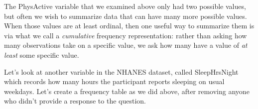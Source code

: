 \documentclass[]{book}
\newenvironment{Shaded}{\begin{snugshade}}{\end{snugshade}}
\newcommand{\KeywordTok}[1]{\textcolor[rgb]{0.13,0.29,0.53}{\textbf{#1}}}
\newcommand{\DataTypeTok}[1]{\textcolor[rgb]{0.13,0.29,0.53}{#1}}
\newcommand{\DecValTok}[1]{\textcolor[rgb]{0.00,0.00,0.81}{#1}}
\newcommand{\StringTok}[1]{\textcolor[rgb]{0.31,0.60,0.02}{#1}}
\newcommand{\CommentTok}[1]{\textcolor[rgb]{0.56,0.35,0.01}{\textit{#1}}}
\newcommand{\OperatorTok}[1]{\textcolor[rgb]{0.81,0.36,0.00}{\textbf{#1}}}
\newcommand{\NormalTok}[1]{#1}
\theoremstyle{definition}
\theoremstyle{definition}
\theoremstyle{definition}
\theoremstyle{remark}
\begin{document}
The PhysActive variable that we examined above only had two possible
values, but often we wish to summarize data that can have many more
possible values. When those values are at least ordinal, then one useful
way to summarize them is via what we call a \emph{cumulative} frequency
representation: rather than asking how many observations take on a
specific value, we ask how many have a value of \emph{at least} some
specific value.

Let's look at another variable in the NHANES dataset, called
SleepHrsNight which records how many hours the participant reports
sleeping on usual weekdays. Let's create a frequency table as we did
above, after removing anyone who didn't provide a response to the
question.

\begin{Shaded}
\end{Shaded}
\end{document}
